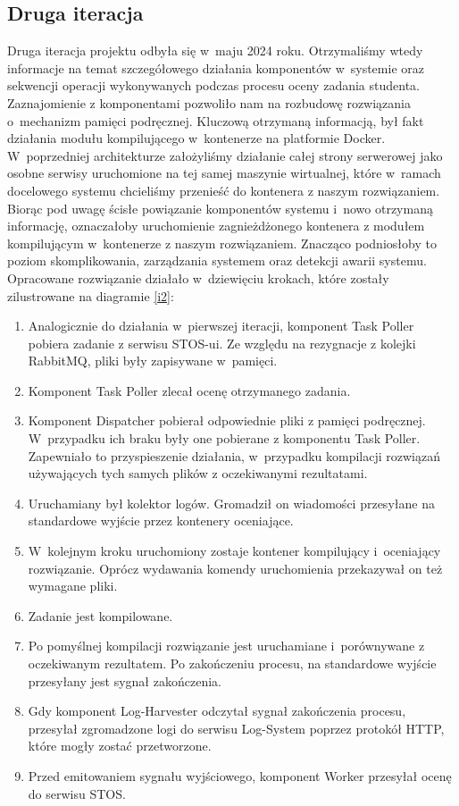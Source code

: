\subsection{Druga iteracja}
Druga iteracja projektu odbyła się w~maju 2024 roku. Otrzymaliśmy wtedy informacje na temat szczegółowego działania komponentów w~systemie oraz sekwencji operacji wykonywanych podczas procesu oceny zadania studenta. Zaznajomienie z komponentami pozwoliło nam na rozbudowę rozwiązania o~mechanizm pamięci podręcznej. Kluczową otrzymaną informacją, był fakt działania modułu kompilującego w~kontenerze na platformie Docker. W~poprzedniej architekturze założyliśmy działanie całej strony serwerowej jako osobne serwisy uruchomione na tej samej maszynie wirtualnej, które w~ramach docelowego systemu chcieliśmy przenieść do kontenera z naszym rozwiązaniem. Biorąc pod uwagę ścisłe powiązanie komponentów systemu i~nowo otrzymaną informację, oznaczałoby uruchomienie zagnieżdżonego kontenera z modułem kompilującym w~kontenerze z naszym rozwiązaniem. Znacząco podniosłoby to poziom skomplikowania, zarządzania systemem oraz detekcji awarii systemu. Opracowane rozwiązanie działało w~dziewięciu krokach, które zostały zilustrowane na diagramie \ref{i2}:
\begin{enumerate}
	\item Analogicznie do działania w~pierwszej iteracji, komponent Task Poller pobiera zadanie z serwisu STOS-ui. Ze względu na rezygnacje z kolejki RabbitMQ, pliki były zapisywane w~pamięci.
	\item Komponent Task Poller zlecał ocenę otrzymanego zadania.
	\item Komponent Dispatcher pobierał odpowiednie pliki z pamięci podręcznej. W~przypadku ich braku były one pobierane z komponentu Task Poller. Zapewniało to przyspieszenie działania, w~przypadku kompilacji rozwiązań używających tych samych plików z oczekiwanymi rezultatami.
	\item Uruchamiany był kolektor logów. Gromadził on wiadomości przesyłane na standardowe wyjście przez kontenery oceniające.
	\item W~kolejnym kroku uruchomiony zostaje kontener kompilujący i~oceniający rozwiązanie. Oprócz wydawania komendy uruchomienia przekazywał on też wymagane pliki.
	\item Zadanie jest kompilowane.
	\item Po pomyślnej kompilacji rozwiązanie jest uruchamiane i~porównywane z oczekiwanym rezultatem. Po zakończeniu procesu, na standardowe wyjście przesyłany jest sygnał zakończenia.
	\item Gdy komponent Log-Harvester odczytał sygnał zakończenia procesu, przesyłał zgromadzone logi do serwisu Log-System poprzez protokół HTTP, które mogły zostać przetworzone.
	\item Przed emitowaniem sygnału wyjściowego, komponent Worker przesyłał ocenę do serwisu STOS.
\end{enumerate}
